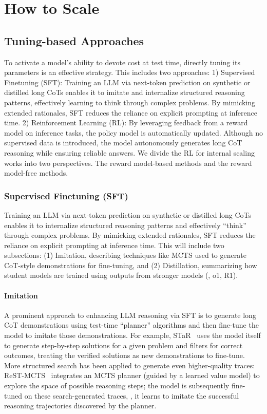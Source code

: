 \section{How to Scale}
\label{sec:how2scale}

\subsection{Tuning-based Approaches}
\label{subsec:tuning}

To activate a model’s ability to devote cost at test time, directly tuning its parameters is an effective strategy. This includes two approaches:
1) Supervised Finetuning (SFT): Training an LLM via next-token prediction on synthetic or distilled long CoTs enables it to imitate and internalize structured reasoning patterns, effectively learning to think through complex problems. By mimicking extended rationales, SFT reduces the reliance on explicit prompting at inference time. 
2) Reinforcement Learning (RL): By leveraging feedback from a reward model on inference tasks, the policy model is automatically updated. Although no supervised data is introduced, the model autonomously generates long CoT reasoning while ensuring reliable answers.
We divide the RL for internal scaling works into two perspectives. The reward model-based methods and the reward model-free methods. 

\subsubsection{Supervised Finetuning (SFT)}
\label{subsubsec:sft}
Training an LLM via next-token prediction on synthetic or distilled long CoTs enables it to internalize structured reasoning patterns and effectively ``think'' through complex problems. By mimicking extended rationales, SFT reduces the reliance on explicit prompting at inference time. This will include two subsections: (1) Imitation, describing techniques like MCTS used to generate CoT-style demonstrations for fine-tuning, and (2) Distillation, summarizing how student models are trained using outputs from stronger models (\eg, o1, R1).

\paragraph{Imitation}
A prominent approach to enhancing LLM reasoning via SFT is to generate long CoT demonstrations using test-time ``planner'' algorithms and then fine-tune the model to imitate those demonstrations. For example, STaR~\citep{zelikman2022star} uses the model itself to generate step-by-step solutions for a given problem and filters for correct outcomes, treating the verified solutions as new demonstrations to fine-tune. More structured search has been applied to generate even higher-quality traces: ReST-MCTS~\citep{zhang2024rest} integrates an MCTS planner (guided by a learned value model) to explore the space of possible reasoning steps; the model is subsequently fine-tuned on these search-generated traces, \ie, it learns to imitate the successful reasoning trajectories discovered by the planner.

